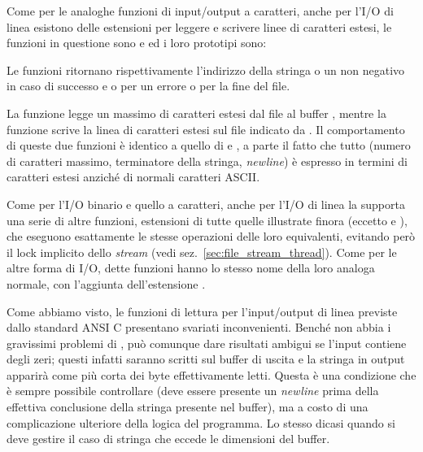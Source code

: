Come per le analoghe funzioni di input/output a caratteri, anche per l'I/O di
linea esistono delle estensioni per leggere e scrivere linee di caratteri
estesi, le funzioni in questione sono  e  ed i
loro prototipi sono:

\begin{funcproto}{
}

{Le funzioni ritornano rispettivamente l'indirizzo della stringa o un non
  negativo in caso di successo e  o  per un errore o per la
  fine del file.}
\end{funcproto}


La funzione  legge un massimo di  caratteri estesi dal
file  al buffer , mentre la funzione 
scrive la linea  di caratteri estesi sul file indicato
da .  Il comportamento di queste due funzioni è identico a
quello di  e , a parte il fatto che tutto (numero di
caratteri massimo, terminatore della stringa, \textit{newline}) è espresso in
termini di caratteri estesi anziché di normali caratteri ASCII.

Come per l'I/O binario e quello a caratteri, anche per l'I/O di linea la
 supporta una serie di altre funzioni, estensioni di tutte quelle
illustrate finora (eccetto  e ), che eseguono
esattamente le stesse operazioni delle loro equivalenti, evitando però il lock
implicito dello \textit{stream} (vedi sez.~\ref{sec:file_stream_thread}). Come
per le altre forma di I/O, dette funzioni hanno lo stesso nome della loro
analoga normale, con l'aggiunta dell'estensione .

Come abbiamo visto, le funzioni di lettura per l'input/output di linea
previste dallo standard ANSI C presentano svariati inconvenienti. Benché
 non abbia i gravissimi problemi di , può comunque dare
risultati ambigui se l'input contiene degli zeri; questi infatti saranno
scritti sul buffer di uscita e la stringa in output apparirà come più corta
dei byte effettivamente letti. Questa è una condizione che è sempre possibile
controllare (deve essere presente un \textit{newline} prima della effettiva
conclusione della stringa presente nel buffer), ma a costo di una
complicazione ulteriore della logica del programma. Lo stesso dicasi quando si
deve gestire il caso di stringa che eccede le dimensioni del buffer.

